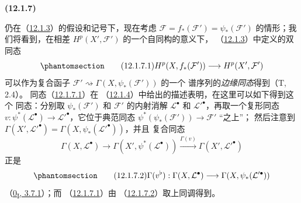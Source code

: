 \documentclass[UTF8,fontset=none,11pt,oneside,openany]{ctexbook}
\renewcommand{\leadsto}{\mathrel{\rightsquigarrow}}
\newenvironment{env}[1][]{%
  \par\medskip\noindent\textbf{(#1)}\ %
}{\par}
\newcommand{\oldpage}[2][]{%
  \hypertarget{ega-source-page-#1-#2}{}%
  \marginnote{\scriptsize\textbf{#1}~|~#2}\ignorespaces}
\let\EGAOriginalLabel\label
\renewcommand{\label}[1]{\phantomsection\EGAOriginalLabel{#1}}
\begin{document}
\begin{env}[12.1.7]
\label{0.12.1.7-fr}
仍在（\hyperref[0.12.1.3-fr]{12.1.3}）的假设和记号下，现在考虑
$\mathcal F=f_*(\mathcal F')=\psi_*(\mathcal F')$ 的情形；我们将看到，在相差
$H^p(X',\mathcal F')$ 的一个自同构的意义下，
（\hyperref[0.12.1.3-fr]{12.1.3}）中定义的双同态
\[
\label{0.12.1.7.1-fr}
\tag{12.1.7.1}
H^p(X,f_*(\mathcal F'))\longrightarrow H^p(X',\mathcal F')
\]
可以作为复合函子 $\mathcal F'\leadsto\Gamma(X,\psi_*(\mathcal F'))$ 的一个
谱序列的\emph{边缘同态}得到（T, 2.4）。
同态（\hyperref[0.12.1.7.1-fr]{12.1.7.1}）在
（\hyperref[0.12.1.4-fr]{12.1.4}）中给出的描述表明，在这里可以如下得到这个
同态：分别取 $\psi_*(\mathcal F')$ 和 $\mathcal F'$ 的内射消解
$\mathcal L^\bullet$ 和 $\mathcal L'^\bullet$，再取一个复形同态
$v:\psi^*(\mathcal L^\bullet)\to\mathcal L'^\bullet$，它位于典范同态
$\psi^*(\psi_*(\mathcal F'))\to\mathcal F'$ “之上”；
\oldpage[0\textsubscript{III}]{56}
然后注意到
$\Gamma(X',\mathcal L'^\bullet)=\Gamma(X,\psi_*(\mathcal L'^\bullet))$，并且
复合同态
\[
\Gamma(X,\mathcal L^\bullet)\longrightarrow
\Gamma(X',\psi^*(\mathcal L^\bullet))
\xrightarrow{\Gamma(v)}\Gamma(X',\mathcal L'^\bullet)
\]
正是
\[
\label{0.12.1.7.2-fr}
\tag{12.1.7.2}
\Gamma(v^\flat):\Gamma(X,\mathcal L^\bullet)
\longrightarrow\Gamma(X,\psi_*(\mathcal L'^\bullet))
\]
（\hyperref[0.3.7.1-fr]{0\textsubscript{I}, 3.7.1}）；而
（\hyperref[0.12.1.7.1-fr]{12.1.7.1}）由
（\hyperref[0.12.1.7.2-fr]{12.1.7.2}）取上同调得到。


\end{env}
\end{document}
